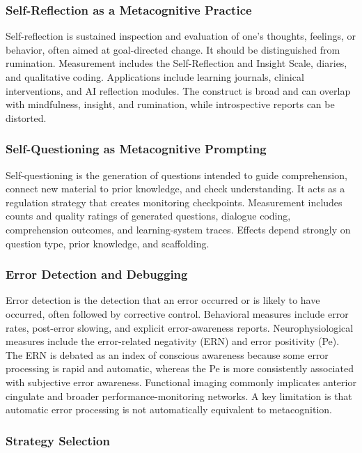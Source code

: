 \documentclass[a4paper]{article}
\begin{document}
   \subsubsection{Self-Reflection as a Metacognitive Practice}

   Self-reflection is sustained inspection and evaluation of one's thoughts, feelings, or behavior, often aimed at goal-directed change. It should be distinguished from rumination. Measurement includes the Self-Reflection and Insight Scale, diaries, and qualitative coding. Applications include learning journals, clinical interventions, and AI reflection modules. The construct is broad and can overlap with mindfulness, insight, and rumination, while introspective reports can be distorted.

   \subsubsection{Self-Questioning as Metacognitive Prompting}

   Self-questioning is the generation of questions intended to guide comprehension, connect new material to prior knowledge, and check understanding. It acts as a regulation strategy that creates monitoring checkpoints. Measurement includes counts and quality ratings of generated questions, dialogue coding, comprehension outcomes, and learning-system traces. Effects depend strongly on question type, prior knowledge, and scaffolding.

   \subsubsection{Error Detection and Debugging}

   Error detection is the detection that an error occurred or is likely to have occurred, often followed by corrective control. Behavioral measures include error rates, post-error slowing, and explicit error-awareness reports. Neurophysiological measures include the error-related negativity (ERN) and error positivity (Pe). The ERN is debated as an index of conscious awareness because some error processing is rapid and automatic, whereas the Pe is more consistently associated with subjective error awareness. Functional imaging commonly implicates anterior cingulate and broader performance-monitoring networks. A key limitation is that automatic error processing is not automatically equivalent to metacognition.

   \subsubsection{Strategy Selection}
\end{document}
